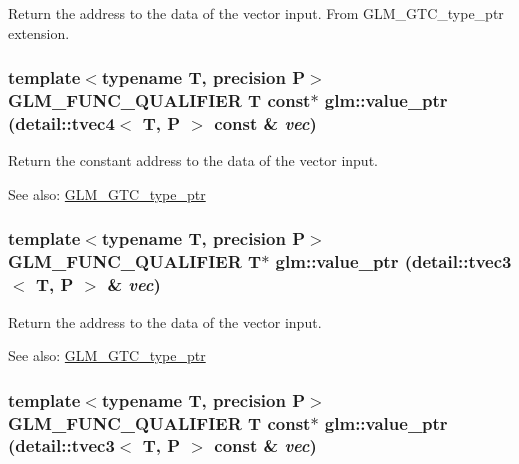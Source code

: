 Return the address to the data of the vector input. From GLM\_\-GTC\_\-type\_\-ptr extension. \hypertarget{group__gtc__type__ptr_gc66d56efb1b37e96a17d235374f53a03}{
\subsubsection[value\_\-ptr]{\setlength{\rightskip}{0pt plus 5cm}template$<$typename T, precision P$>$ GLM\_\-FUNC\_\-QUALIFIER T const$\ast$ glm::value\_\-ptr (detail::tvec4$<$ T, P $>$ const \& {\em vec})}}
\label{group__gtc__type__ptr_gc66d56efb1b37e96a17d235374f53a03}


Return the constant address to the data of the vector input. \begin{Desc}
\item[See also:]\hyperlink{group__gtc__type__ptr}{GLM\_\-GTC\_\-type\_\-ptr} \end{Desc}
\hypertarget{group__gtc__type__ptr_ga3e39c9c4cf1c1f573037fb2d6e6a1f9}{
\subsubsection[value\_\-ptr]{\setlength{\rightskip}{0pt plus 5cm}template$<$typename T, precision P$>$ GLM\_\-FUNC\_\-QUALIFIER T$\ast$ glm::value\_\-ptr (detail::tvec3$<$ T, P $>$ \& {\em vec})}}
\label{group__gtc__type__ptr_ga3e39c9c4cf1c1f573037fb2d6e6a1f9}


Return the address to the data of the vector input. \begin{Desc}
\item[See also:]\hyperlink{group__gtc__type__ptr}{GLM\_\-GTC\_\-type\_\-ptr} \end{Desc}
\hypertarget{group__gtc__type__ptr_g5668973c91b739c1a19f0ef201ddce50}{
\subsubsection[value\_\-ptr]{\setlength{\rightskip}{0pt plus 5cm}template$<$typename T, precision P$>$ GLM\_\-FUNC\_\-QUALIFIER T const$\ast$ glm::value\_\-ptr (detail::tvec3$<$ T, P $>$ const \& {\em vec})}}
\label{group__gtc__type__ptr_g5668973c91b739c1a19f0ef201ddce50}


